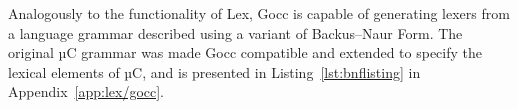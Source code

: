 Analogously to the functionality of Lex, Gocc is capable of generating lexers from a language grammar described using a variant of Backus–Naur Form. The original µC grammar was made Gocc compatible and extended to specify the lexical elements of µC, and is presented in Listing~\ref{lst:bnflisting} in Appendix~\ref{app:lex/gocc}.





